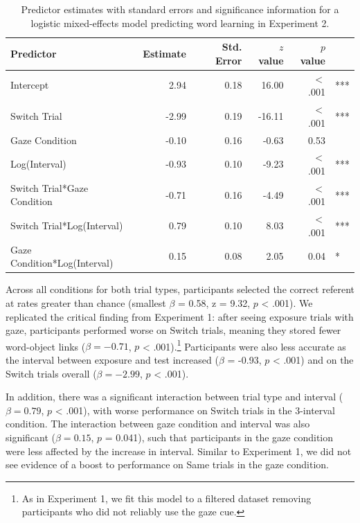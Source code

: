 \documentclass[authoryear, review]{elsarticle}
\begin{document}
\begin{table}[tb]
\centering
\begin{tabular}{lrrrrl}
 Predictor & Estimate & Std. Error & $z$ value & $p$ value &  \\ 
  \hline
Intercept & 2.94 & 0.18 & 16.00 & $<$ .001 & *** \\ 
  Switch Trial & -2.99 & 0.19 & -16.11 & $<$ .001 & *** \\ 
  Gaze Condition & -0.10 & 0.16 & -0.63 & 0.53 &  \\ 
  Log(Interval) & -0.93 & 0.10 & -9.23 & $<$ .001 & *** \\ 
  Switch Trial*Gaze Condition & -0.71 & 0.16 & -4.49 & $<$ .001 & *** \\ 
  Switch Trial*Log(Interval) & 0.79 & 0.10 & 8.03 & $<$ .001 & *** \\ 
  Gaze Condition*Log(Interval) & 0.15 & 0.08 & 2.05 & 0.04 & * \\ 
   \hline
\end{tabular}
\caption{Predictor estimates with standard errors and significance information for a logistic mixed-effects model predicting word learning in Experiment 2.} 
\label{tab:exp2_reg}
\end{table}

Across all conditions for both trial types, participants selected the
correct referent at rates greater than chance (smallest \(\beta\) =
0.58, z = 9.32, \(p\) \textless{} .001). We replicated the critical
finding from Experiment 1: after seeing exposure trials with gaze,
participants performed worse on Switch trials, meaning they stored fewer
word-object links (\(\beta = -0.71\), \(p\) \textless{}
.001).\footnote{As in Experiment 1, we fit this model to a filtered dataset removing participants who did not reliably use the gaze cue.}
Participants were also less accurate as the interval between exposure
and test increased (\(\beta\) = -0.93, \(p\) \textless{} .001) and on
the Switch trials overall (\(\beta = -2.99\), \(p\) \textless{} .001).

In addition, there was a significant interaction between trial type and
interval (\(\beta = 0.79\), \(p\) \textless{} .001), with worse
performance on Switch trials in the 3-interval condition. The
interaction between gaze condition and interval was also significant
(\(\beta = 0.15\), \(p\) = 0.041), such that participants in the gaze
condition were less affected by the increase in interval. Similar to
Experiment 1, we did not see evidence of a boost to performance on Same
trials in the gaze condition.
\end{document}
